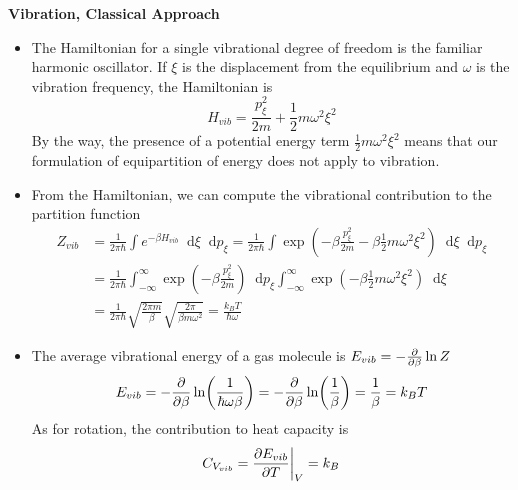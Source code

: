 \documentclass[11pt, a4paper]{article}
\newcommand{\diff}{\mathop{}\!\mathrm{d}} %
\begin{document}
\smallskip
\textbf{Vibration, Classical Approach}
\begin{itemize}
	\item The Hamiltonian for a single vibrational degree of freedom is the familiar harmonic oscillator. If $ \xi $ is the displacement from the equilibrium and $ \omega $ is the vibration frequency, the Hamiltonian is		
	\begin{equation*}
		H_{vib} = \frac{p_{\xi}^{2}}{2m} + \frac{1}{2} m \omega^{2}\xi^{2}
	\end{equation*}
	By the way, the presence of a potential energy term $ \frac{1}{2} m \omega^{2}\xi^{2} $ means that our formulation of equipartition of energy does not apply to vibration. 
	
	\item From the Hamiltonian, we can compute the vibrational contribution to the partition function
	\begin{align*}
		Z_{vib} &= \frac{1}{2\pi \hbar} \int e^{-\beta H_{vib}} \diff \xi \diff p_{\xi} = \frac{1}{2\pi \hbar} \int \exp(-\beta \frac{p_{\xi}^{2}}{2m} -\beta  \frac{1}{2} m \omega^{2}\xi^{2}) \diff \xi \diff p_{\xi}\\
		&=\frac{1}{2\pi \hbar} \int_{-\infty}^{\infty} \exp(-\beta \frac{p_{\xi}^{2}}{2m})\diff p_{\xi} \int_{-\infty}^{\infty}\exp(-\beta  \frac{1}{2} m \omega^{2}\xi^{2}) \diff \xi \\
		&=\frac{1}{2\pi \hbar} \sqrt{\frac{2\pi m}{\beta}} \sqrt{\frac{2\pi}{\beta m \omega^{2}}} = \frac{k_{B}T}{\hbar \omega}
	\end{align*}
	
	\item The average vibrational energy of a gas molecule is $ E_{vib} = -\pdv{}{\beta} \ln Z  $
	\begin{equation*}
		E_{vib} = -\pdv{}{\beta} \ln(\frac{1}{\hbar \omega \beta}) = -\pdv{}{\beta} \ln(\frac{1}{\beta}) = \frac{1}{\beta} = k_{B}T
	\end{equation*}
	As for rotation, the contribution to heat capacity is
	\begin{equation*}
		C_{V_{vib}} = \pdv{E_{vib}}{T} \bigg |_{V} = k_{B}
	\end{equation*}
\end{itemize}
\end{document}
